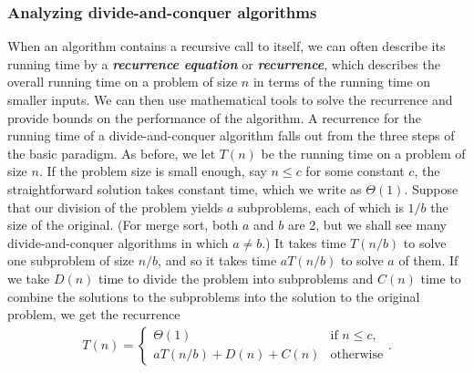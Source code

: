 \documentclass{report}
\begin{document}
        \subsubsection{Analyzing divide-and-conquer algorithms}
        \bigbreak \noindent 
        When an algorithm contains a recursive call to itself, we can often describe its running time by a \textbf{\textit{recurrence equation}} or \textbf{\textit{recurrence}}, which describes the overall running time on a problem of size $n$ in terms of the running time on smaller inputs. We can then use mathematical tools to solve the recurrence and provide bounds on the performance of the algorithm.
        \bigbreak \noindent 
        A recurrence for the running time of a divide-and-conquer algorithm falls out from the three steps of the basic paradigm. As before, we let $T(n)$ be the running time on a problem of size $n$. If the problem size is small enough, say $n \leq c$ for some constant $c$, the straightforward solution takes constant time, which we write as $\Theta(1)$. Suppose that our division of the problem yields $a$ subproblems, each of which is $1/b$ the size of the original. (For merge sort, both $a$ and $b$ are 2, but we shall see many divide-and-conquer algorithms in which $a \neq b$.) It takes time $T(n/b)$ to solve one subproblem of size $n/b$, and so it takes time $aT(n/b)$ to solve $a$ of them. If we take $D(n)$ time to divide the problem into subproblems and $C(n)$ time to combine the solutions to the subproblems into the solution to the original problem, we get the recurrence
        \begin{align*}
            T(n) =
            \begin{cases}
                \Theta(1) & \text{if } n \leq c , \\
                aT(n/b) + D(n) + C(n) & \text{otherwise}
            \end{cases}
        .\end{align*}

        \bigbreak \noindent 
\end{document}
